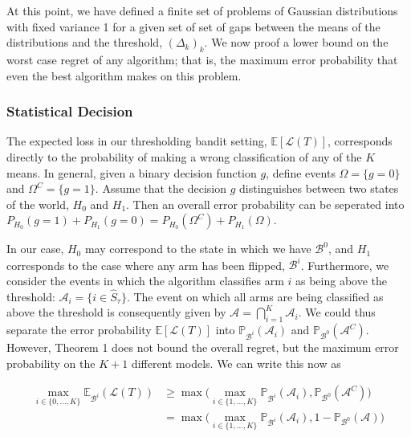 \documentclass[11pt,]{article}
\begin{document}
At this point, we have defined a finite set of problems of Gaussian
distributions with fixed variance 1 for a given set of set of gaps
between the means of the distributions and the threshold,
\((\Delta_k)_k\). We now proof a lower bound on the worst case regret of
any algorithm; that is, the maximum error probability that even the best
algorithm makes on this problem.

\subsubsection{Statistical Decision}\label{statistical-decision}

The expected loss in our thresholding bandit setting,
\(\mathbb{E}[\mathcal{L}(T)]\), corresponds directly to the probability
of making a wrong classification of any of the \(K\) means. In general,
given a binary decision function \(g\), define events
\(\Omega = \{g = 0\}\) and \(\Omega^C = \{g = 1\}\). Assume that the
decision \(g\) distinguishes between two states of the world, \(H_0\)
and \(H_1\). Then an overall error probability can be seperated into
\(P_{H_0}(g=1) + P_{H_1}(g = 0) = P_{H_0}(\Omega^C) + P_{H_1}(\Omega)\).

In our case, \(H_0\) may correspond to the state in which we have
\(\mathcal{B}^0\), and \(H_1\) corresponds to the case where any arm has
been flipped, \(\mathcal{B}^i\). Furthermore, we consider the events in
which the algorithm classifies arm \(i\) as being above the threshold:
\(\mathcal{A}_i = \{i \in \hat{S}_\tau\}\). The event on which all arms
are being classified as above the threshold is consequently given by
\(\mathcal{A} = \bigcap_{i=1}^K \mathcal{A}_i\). We could thus separate
the error probability \(\mathbb{E}[\mathcal{L}(T)]\) into
\(\mathbb{P}_{\mathcal{B}^i}(\mathcal{A}_i)\) and
\(\mathbb{P}_{\mathcal{B}^0}(\mathcal{A}^C)\). However, Theorem 1 does
not bound the overall regret, but the maximum error probability on the
\(K+1\) different models. We can write this now as

\begin{align}
\max_{i \in \{0, \dots, K\}} \mathbb{E}_{\mathcal{B}^i} (\mathcal{L}(T)) & \geq \max \big( \max_{i \in \{1, \dots, K\}} \mathbb{P}_{\mathcal{B}^i}(\mathcal{A}_i), \mathbb{P}_{\mathcal{B}^0}(\mathcal{A}^C) \big) \\
& = \max \big( \max_{i \in \{1, \dots, K\}} \mathbb{P}_{\mathcal{B}^i}(\mathcal{A}_i), 1 - \mathbb{P}_{\mathcal{B}^0}(\mathcal{A}) \big) \label{LocatelliTheorem1ExpRegret}
\end{align}
\end{document}

